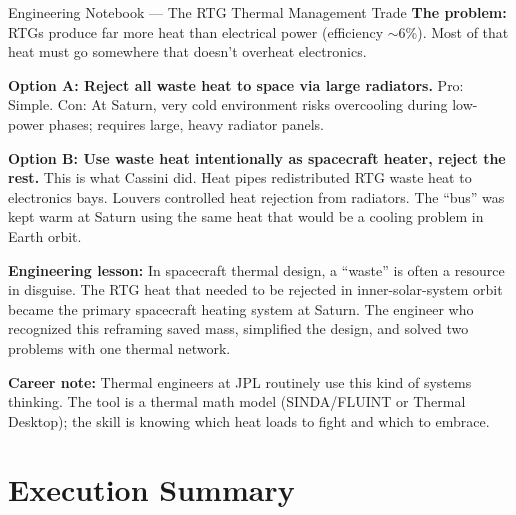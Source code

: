 \documentclass[11pt,letterpaper]{article}
\begin{document}
\begin{engbox}{Engineering Notebook — The RTG Thermal Management Trade}
\textbf{The problem:} RTGs produce far more heat than electrical power (efficiency $\sim$6\%). Most of that heat must go somewhere that doesn't overheat electronics.

\textbf{Option A: Reject all waste heat to space via large radiators.} Pro: Simple. Con: At Saturn, very cold environment risks overcooling during low-power phases; requires large, heavy radiator panels.

\textbf{Option B: Use waste heat intentionally as spacecraft heater, reject the rest.} This is what Cassini did. Heat pipes redistributed RTG waste heat to electronics bays. Louvers controlled heat rejection from radiators. The ``bus'' was kept warm at Saturn using the same heat that would be a cooling problem in Earth orbit.

\textbf{Engineering lesson:} In spacecraft thermal design, a ``waste'' is often a resource in disguise. The RTG heat that needed to be rejected in inner-solar-system orbit became the primary spacecraft heating system at Saturn. The engineer who recognized this reframing saved mass, simplified the design, and solved two problems with one thermal network.

\textbf{Career note:} Thermal engineers at JPL routinely use this kind of systems thinking. The tool is a thermal math model (SINDA/FLUINT or Thermal Desktop); the skill is knowing which heat loads to fight and which to embrace.
\end{engbox}

\section{Execution Summary}
\end{document}
